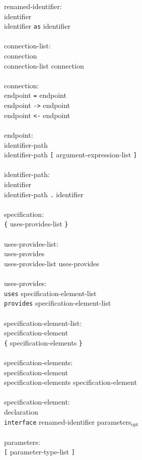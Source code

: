 \documentclass[11pt]{article}
\newcommand{\kw}[1]{{\tt #1}}
\newcommand{\opt}{$_\mbox{opt}$\xspace}
\begin{document}
{\begin{tabbing}
renamed-identifier:\\
\>	identifier\\
\>	identifier \kw{as} identifier\\
\\
connection-list:\\
\>	connection\\
\>	connection-list connection\\
\\
connection:\\
\>	endpoint \kw{=} endpoint\\
\>	endpoint \kw{->} endpoint\\
\>	endpoint \kw{<-} endpoint\\
\\
endpoint:\\
\>	identifier-path \\
\>	identifier-path \kw{[} argument-expression-list \kw{]}\\
\\
identifier-path:\\
\>	identifier\\
\>	identifier-path \kw{.} identifier\\
\\
specification:\\
\>	\kw{\{} uses-provides-list \kw{\}}\\
\\
uses-provides-list:\\
\>	uses-provides\\
\>	uses-provides-list uses-provides\\
\\
uses-provides:\\
\>	\kw{uses} specification-element-list\\
\>	\kw{provides} specification-element-list\\
\\
specification-element-list:\\
\>	specification-element\\
\>	\kw{\{} specification-elements \kw{\}}\\
\\
specification-elements:\\
\>	specification-element\\
\>	specification-elements specification-element\\
\\
specification-element:\\
\>	declaration\\
\>	\kw{interface} renamed-identifier parameters\opt\\
\\
parameters:\\
\>	\kw{[} parameter-type-list \kw{]}
\end{tabbing}}
\end{document}
